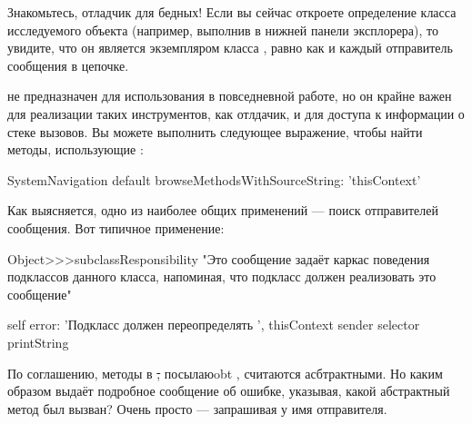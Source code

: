 \documentclass[a4paper,10pt,twoside]{book}
\begin{document}
Знакомьтесь, отладчик для бедных!
Если вы сейчас откроете определение класса исследуемого объекта (например, выполнив  в нижней панели эксплорера), то увидите, что он является экземпляром класса , равно как и каждый отправитель сообщения в цепочке.

 не предназначен для использования в повседневной работе, но он крайне важен для реализации таких инструментов, как отлдачик, и для доступа к информации о стеке вызовов.
Вы можете выполнить следующее выражение, чтобы найти методы, использующие :

\begin{code}{}
SystemNavigation default browseMethodsWithSourceString: 'thisContext'
\end{code}

Как выясняется, одно из наиболее общих применений --- поиск отправителей сообщения.
Вот типичное применение:
\begin{code}{}
Object>>>subclassResponsibility
	"Это сообщение задаёт каркас поведения подклассов данного класса, 
	напоминая, что подкласс должен реализовать это сообщение"

	self error: 'Подкласс должен переопределять ', thisContext sender selector printString
\end{code}

По соглашению, методы в \st, посылаюobt , считаются асбтрактными. Но каким образом  выдаёт подробное сообщение об ошибке, указывая, какой абстрактный метод был вызван? Очень просто --- запрашивая у  имя отправителя.
\end{document}
